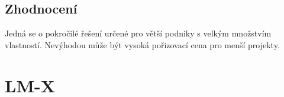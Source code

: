 \subsection*{Zhodnocení}
Jedná se o pokročilé řešení určené pro větší podniky s velkým množstvím
vlastností. Nevýhodou může být vysoká pořizovací cena pro menší projekty.

\section{LM-X}
% 
% 
% 
% 
% 


